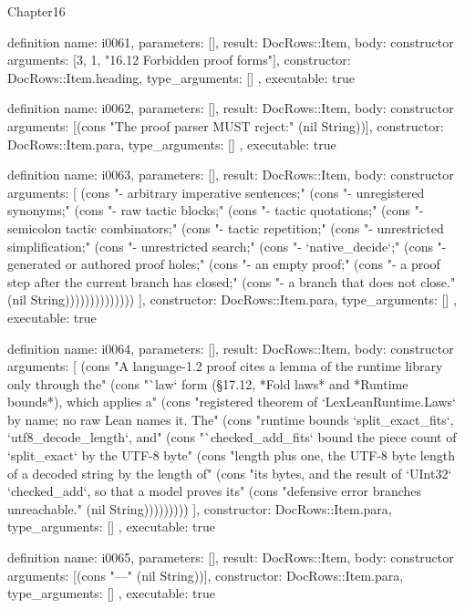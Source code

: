 \begin{lexlean}{Chapter16}
\begin{semanticmodule}
definition{
  name: i0061,
  parameters: [],
  result: DocRows::Item,
  body: constructor{
    arguments: [3, 1, "16.12 Forbidden proof forms"],
    constructor: DocRows::Item.heading,
    type_arguments: []
  },
  executable: true
}

definition{
  name: i0062,
  parameters: [],
  result: DocRows::Item,
  body: constructor{
    arguments: [(cons "The proof parser MUST reject:" (nil String))],
    constructor: DocRows::Item.para,
    type_arguments: []
  },
  executable: true
}

definition{
  name: i0063,
  parameters: [],
  result: DocRows::Item,
  body: constructor{
    arguments: [
      (cons "- arbitrary imperative sentences;" (cons "- unregistered synonyms;" (cons "- raw tactic blocks;" (cons "- tactic quotations;" (cons "- semicolon tactic combinators;" (cons "- tactic repetition;" (cons "- unrestricted simplification;" (cons "- unrestricted search;" (cons "- `native_decide`;" (cons "- generated or authored proof holes;" (cons "- an empty proof;" (cons "- a proof step after the current branch has closed;" (cons "- a branch that does not close." (nil String))))))))))))))
    ],
    constructor: DocRows::Item.para,
    type_arguments: []
  },
  executable: true
}

definition{
  name: i0064,
  parameters: [],
  result: DocRows::Item,
  body: constructor{
    arguments: [
      (cons "A language-1.2 proof cites a lemma of the runtime library only through the" (cons "`law` form (§17.12, *Fold laws* and *Runtime bounds*), which applies a" (cons "registered theorem of `LexLeanRuntime.Laws` by name; no raw Lean names it. The" (cons "runtime bounds `split_exact_fits`, `utf8_decode_length`, and" (cons "`checked_add_fits` bound the piece count of `split_exact` by the UTF-8 byte" (cons "length plus one, the UTF-8 byte length of a decoded string by the length of" (cons "its bytes, and the result of `UInt32` `checked_add`, so that a model proves its" (cons "defensive error branches unreachable." (nil String)))))))))
    ],
    constructor: DocRows::Item.para,
    type_arguments: []
  },
  executable: true
}

definition{
  name: i0065,
  parameters: [],
  result: DocRows::Item,
  body: constructor{
    arguments: [(cons "---" (nil String))],
    constructor: DocRows::Item.para,
    type_arguments: []
  },
  executable: true
}
\end{semanticmodule}
\end{lexlean}
